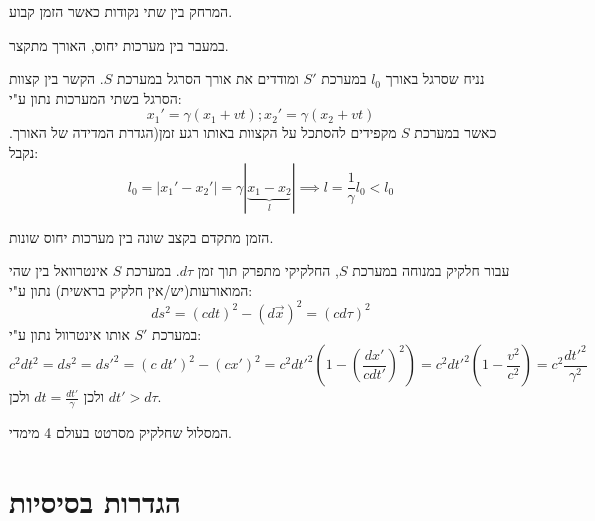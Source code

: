 \documentclass{tstextbook}
\begin{document}
\begin{definition}[אורך]
המרחק בין שתי נקודות כאשר הזמן קבוע.

\end{definition}
\begin{definition}
במעבר בין מערכות יחוס, האורך מתקצר.

\end{definition}
\begin{example}
נניח שסרגל באורך \(l_{0}\) במערכת \(S'\) ומודדים את אורך הסרגל במערכת \(S\). 
הקשר בין קצוות הסרגל בשתי המערכות נתון ע"י:
$$x_{1}'=\gamma(x_{1}+vt);x_{2}'=\gamma(x_{2}+vt)$$
כאשר במערכת \(S\) מקפידים להסתכל על הקצוות באותו רגע זמן(הגדרת המדידה של האורך. נקבל:
$$l_{0}=|x_{1}'-x_{2}'|=\gamma|\underbrace{ x_{1}-x_{2} }_{ l }|\implies l=\frac{1}{\gamma}l_{0}<l_{0}$$

\end{example}
\begin{definition}
הזמן מתקדם בקצב שונה בין מערכות יחוס שונות.

\end{definition}
\begin{example}
עבור חלקיק במנוחה במערכת \(S\), החלקיקי מתפרק תוך זמן \(d\tau\). 
במערכת \(S\) אינטרוואל בין שהי המואורעות(יש/אין חלקיק בראשית) נתון ע"י:
$$ds^2=(cdt)^2 - { \left( d\vec{x} \right)^2 }=\left( cd\tau \right)^2$$
במערכת \(S'\) אותו אינטרוול נתון ע"י:
$$c^2dt^2=ds^2=ds'^2=\left( c\;dt' \right)^2-(cx')^2=c^2dt'^2\left( 1-\left( \frac{dx'}{cdt'} \right)^2 \right)=c^2dt'^2\left( 1-\frac{v^2}{c^2} \right)=c^2 \frac{dt'^2}{\gamma ^2}$$
ולכן \(dt=\frac{dt'}{\gamma}\) ולכן \(dt'>d\tau\).

\end{example}
\begin{definition}[קו עולם]
המסלול שחלקיק מסרטט בעולם 4 מימדי.

\end{definition}

\section{הגדרות בסיסיות}
\end{document}
